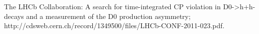 \begin{thebibliography}{100}
  The LHCb Collaboration: A search for time-integrated CP
violation in D0->h+h- decays and a measurement of the D0 production
asymmetry;
http://cdsweb.cern.ch/record/1349500/files/LHCb-CONF-2011-023.pdf.











\end{thebibliography}
